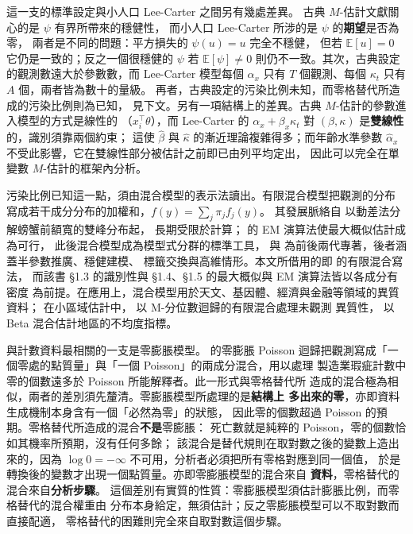 \documentclass[UTF8, fontset=macnew, a4paper, 12pt]{ctexart}
\newcommand{\Ex}{\mathbb{E}}
\begin{document}
這一支的標準設定與小人口 Lee-Carter 之間另有幾處差異。
古典 $M$-估計文獻關心的是 $\psi$ 有界所帶來的穩健性，
而小人口 Lee-Carter 所涉的是 $\psi$ 的\textbf{期望}是否為零，
兩者是不同的問題：平方損失的 $\psi(u)=u$ 完全不穩健，
但若 $\Ex[u]=0$ 它仍是一致的；反之一個很穩健的 $\psi$ 若 $\Ex[\psi]\ne0$
則仍不一致。其次，古典設定的觀測數遠大於參數數，而 Lee-Carter 模型每個
$\alpha_x$ 只有 $T$ 個觀測、每個 $\kappa_t$ 只有 $A$ 個，兩者皆為數十的量級。
再者，古典設定的污染比例未知，而零格替代所造成的污染比例則為已知，
見下文。另有一項結構上的差異。古典 $M$-估計的參數進入模型的方式是線性的
（$x_i^{\top}\theta$），而 Lee-Carter 的 $\alpha_x+\beta_x\kappa_t$ 對
$(\beta,\kappa)$ 是\textbf{雙線性}的，識別須靠兩個約束；
這使 $\hat\beta$ 與 $\hat\kappa$ 的漸近理論複雜得多；而年齡水準參數
$\hat\alpha_x$ 不受此影響，它在雙線性部分被估計之前即已由列平均定出，
因此可以完全在單變數 $M$-估計的框架內分析。

污染比例已知這一點，須由混合模型的表示法讀出。有限混合模型把觀測的分布
寫成若干成分分布的加權和，$f(y)=\sum_{j}\pi_j f_j(y)$。
其發展脈絡自 \citet{pearson1894} 以動差法分解螃蟹前額寬的雙峰分布起，
長期受限於計算；\citet{dempster1977} 的 EM 演算法使最大概似估計成為可行，
此後混合模型成為模型式分群的標準工具，\citet{mclachlan2000} 與
\citet{yao2024} 為前後兩代專著，後者涵蓋半參數推廣、穩健建模、
標籤交換與高維情形。本文所借用的即 \citet[§1.2]{yao2024} 的有限混合寫法，
而該書 §1.3 的識別性與 §1.4、§1.5 的最大概似與 EM 演算法皆以各成分有密度
為前提。在應用上，混合模型用於天文、基因體、經濟與金融等領域的異質資料；
在小區域估計中，\citet{delsarto2019} 以 M-分位數迴歸的有限混合處理未觀測
異質性，\citet{denicolo2023} 以 Beta 混合估計地區的不均度指標。

與計數資料最相關的一支是零膨脹模型。\citet{lambert1992} 的零膨脹 Poisson
迴歸把觀測寫成「一個零處的點質量」與「一個 Poisson」的兩成分混合，用以處理
製造業瑕疵計數中零的個數遠多於 Poisson 所能解釋者。此一形式與零格替代所
造成的混合極為相似，兩者的差別須先釐清。零膨脹模型所處理的是\textbf{結構上
多出來的零}，亦即資料生成機制本身含有一個「必然為零」的狀態，
因此零的個數超過 Poisson 的預期。零格替代所造成的混合\textbf{不是}零膨脹：
死亡數就是純粹的 Poisson，零的個數恰如其機率所預期，沒有任何多餘；
該混合是替代規則在取對數之後的變數上造出來的，因為 $\log 0=-\infty$
不可用，分析者必須把所有零格對應到同一個值，
於是轉換後的變數才出現一個點質量。亦即零膨脹模型的混合來自
\textbf{資料}，零格替代的混合來自\textbf{分析步驟}。
這個差別有實質的性質：零膨脹模型須估計膨脹比例，而零格替代的混合權重由
分布本身給定，無須估計；反之零膨脹模型可以不取對數而直接配適，
零格替代的困難則完全來自取對數這個步驟。
\end{document}
